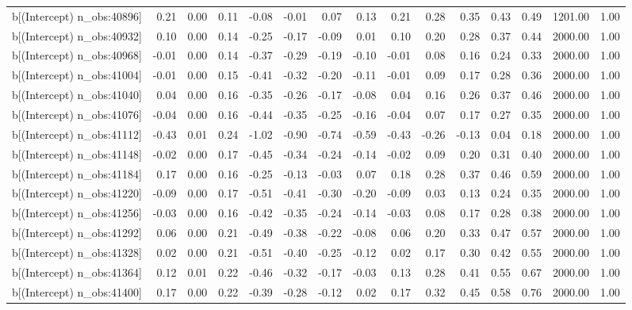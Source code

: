 \begin{table}[ht]
\begin{tabular}{rrrrrrrrrrrrrrr}
  b[(Intercept) n\_obs:40896] & 0.21 & 0.00 & 0.11 & -0.08 & -0.01 & 0.07 & 0.13 & 0.21 & 0.28 & 0.35 & 0.43 & 0.49 & 1201.00 & 1.00 \\ 
  b[(Intercept) n\_obs:40932] & 0.10 & 0.00 & 0.14 & -0.25 & -0.17 & -0.09 & 0.01 & 0.10 & 0.20 & 0.28 & 0.37 & 0.44 & 2000.00 & 1.00 \\ 
  b[(Intercept) n\_obs:40968] & -0.01 & 0.00 & 0.14 & -0.37 & -0.29 & -0.19 & -0.10 & -0.01 & 0.08 & 0.16 & 0.24 & 0.33 & 2000.00 & 1.00 \\ 
  b[(Intercept) n\_obs:41004] & -0.01 & 0.00 & 0.15 & -0.41 & -0.32 & -0.20 & -0.11 & -0.01 & 0.09 & 0.17 & 0.28 & 0.36 & 2000.00 & 1.00 \\ 
  b[(Intercept) n\_obs:41040] & 0.04 & 0.00 & 0.16 & -0.35 & -0.26 & -0.17 & -0.08 & 0.04 & 0.16 & 0.26 & 0.37 & 0.46 & 2000.00 & 1.00 \\ 
  b[(Intercept) n\_obs:41076] & -0.04 & 0.00 & 0.16 & -0.44 & -0.35 & -0.25 & -0.16 & -0.04 & 0.07 & 0.17 & 0.27 & 0.35 & 2000.00 & 1.00 \\ 
  b[(Intercept) n\_obs:41112] & -0.43 & 0.01 & 0.24 & -1.02 & -0.90 & -0.74 & -0.59 & -0.43 & -0.26 & -0.13 & 0.04 & 0.18 & 2000.00 & 1.00 \\ 
  b[(Intercept) n\_obs:41148] & -0.02 & 0.00 & 0.17 & -0.45 & -0.34 & -0.24 & -0.14 & -0.02 & 0.09 & 0.20 & 0.31 & 0.40 & 2000.00 & 1.00 \\ 
  b[(Intercept) n\_obs:41184] & 0.17 & 0.00 & 0.16 & -0.25 & -0.13 & -0.03 & 0.07 & 0.18 & 0.28 & 0.37 & 0.46 & 0.59 & 2000.00 & 1.00 \\ 
  b[(Intercept) n\_obs:41220] & -0.09 & 0.00 & 0.17 & -0.51 & -0.41 & -0.30 & -0.20 & -0.09 & 0.03 & 0.13 & 0.24 & 0.35 & 2000.00 & 1.00 \\ 
  b[(Intercept) n\_obs:41256] & -0.03 & 0.00 & 0.16 & -0.42 & -0.35 & -0.24 & -0.14 & -0.03 & 0.08 & 0.17 & 0.28 & 0.38 & 2000.00 & 1.00 \\ 
  b[(Intercept) n\_obs:41292] & 0.06 & 0.00 & 0.21 & -0.49 & -0.38 & -0.22 & -0.08 & 0.06 & 0.20 & 0.33 & 0.47 & 0.57 & 2000.00 & 1.00 \\ 
  b[(Intercept) n\_obs:41328] & 0.02 & 0.00 & 0.21 & -0.51 & -0.40 & -0.25 & -0.12 & 0.02 & 0.17 & 0.30 & 0.42 & 0.55 & 2000.00 & 1.00 \\ 
  b[(Intercept) n\_obs:41364] & 0.12 & 0.01 & 0.22 & -0.46 & -0.32 & -0.17 & -0.03 & 0.13 & 0.28 & 0.41 & 0.55 & 0.67 & 2000.00 & 1.00 \\ 
  b[(Intercept) n\_obs:41400] & 0.17 & 0.00 & 0.22 & -0.39 & -0.28 & -0.12 & 0.02 & 0.17 & 0.32 & 0.45 & 0.58 & 0.76 & 2000.00 & 1.00 \\ 

\end{tabular}
\end{table}
